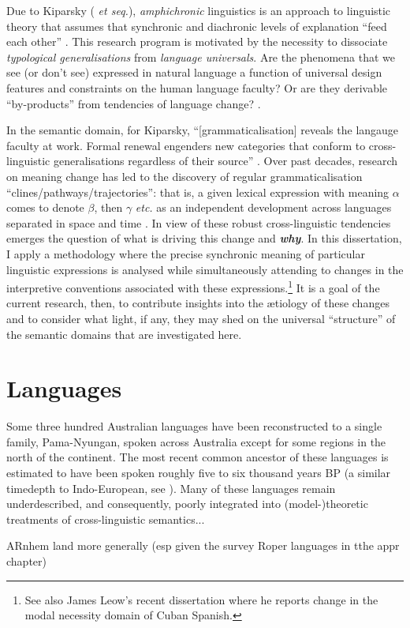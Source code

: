 \documentclass[12pt,dvipsnames]{report}
\begin{document}
Due to Kiparsky (\citeyear{Kiparsky2006} \textit{et seq.}), \textit{amphichronic} linguistics is an approach to linguistic theory that assumes that synchronic and diachronic levels of explanation ``feed each other'' \citep[see also][]{Bermudez-Otero2013}. This research program is motivated by the necessity to dissociate \textit{typological generalisations} from \textit{language universals}. Are the phenomena that we see (or don't see) expressed in natural language a function of universal design features and constraints on the human language faculty? Or are they derivable ``by-products'' from tendencies of language change? \citep[see also][]{Anderson2008,Anderson2016a}.

In the semantic domain, for Kiparsky, ``[grammaticalisation] reveals the langauge faculty at work. Formal renewal engenders new categories that conform to cross-linguistic generalisations regardless of their source'' \citep[73]{Kiparsky2015}. Over past decades, research on meaning change has led to the discovery of regular grammaticalisation ``clines/pathways/trajectories'': that is, a given lexical expression with meaning $ \alpha $ comes to denote $ \beta $, then $ \gamma $ \textit{etc.} as an independent development across languages separated in space and time \citep[see][]{Deo2015,Eckardt2011}. In view of these robust cross-linguistic tendencies emerges the question of what is driving this change and \textbf{\textit{why}}. In this dissertation, I apply a methodology where the precise synchronic meaning of particular linguistic expressions is analysed while simultaneously attending to changes in the interpretive conventions associated with these expressions.\footnote{See also James Leow's recent \citeyearpar{Leow2020} dissertation where he reports change in the modal necessity domain of Cuban Spanish.} It is a goal of the current research, then, to contribute insights into the ætiology of these changes and to consider what light, if any, they may shed on the universal ``structure'' of the semantic domains that are investigated here.

\section{Languages}
{\color{Blue}
Some three hundred Australian languages have been reconstructed to a single family, Pama-Nyungan, spoken across Australia except for some regions in the north of the continent. The most recent common ancestor of these languages is estimated to have been spoken roughly five to six thousand years \textsc{BP} (a similar timedepth to Indo-European, see \citealt[742]{Bouckaert2018}). Many of these languages remain underdescribed, and consequently, poorly integrated into (model-)theoretic treatments of cross-linguistic semantics...



ARnhem land more generally (esp given the survey Roper languages in tthe appr chapter)
}
\end{document}
